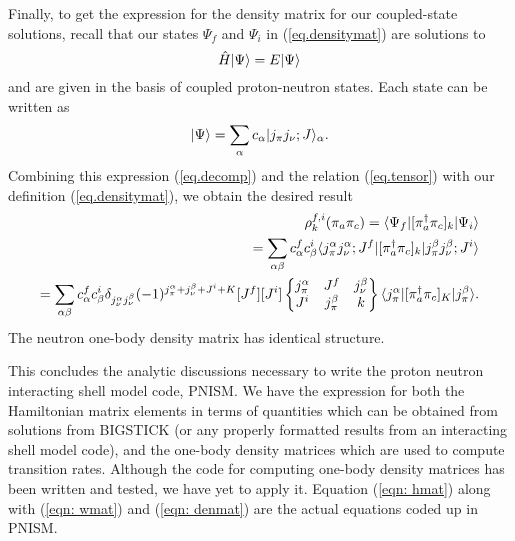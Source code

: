 Finally, to get the expression for the density matrix for our coupled-state solutions, recall
that our states $\Psi_f$ and $\Psi_i$ in (\ref{eq.densitymat}) are solutions to 
\begin{equation}
\hat{H}_{} |\Psi\rangle = E |\Psi\rangle
\end{equation}
and are given in the basis of coupled proton-neutron states. Each state can be written as
\begin{equation}\label{eq.decomp}
|\Psi\rangle=\sum_\alpha c_\alpha |j_{\pi}j_{\nu};J\rangle_\alpha.
\end{equation}
Combining this expression (\ref{eq.decomp}) and the relation (\ref{eq.tensor}) with our definition 
(\ref{eq.densitymat}), we obtain the desired result
\begin{equation}\begin{split}\label{eqn: denmat}
\rho_k^{f,i}(\pi_a\pi_c)=\langle \Psi_f|[\pi_a^{\dagger} \pi_c]_k|\Psi_i\rangle \\
=\sum_{\alpha\beta}c_{\alpha}^fc_{\beta}^i 
\langle j_{\pi}^\alpha j_{\nu}^\alpha;J^f|
[\pi_a^{\dagger} \pi_c]_k
|j_{\pi}^\beta j_{\nu}^\beta;J^i\rangle \\
=\sum_{\alpha\beta}c_{\alpha}^fc_{\beta}^i
\delta_{j_{\nu}^\alpha j_{\nu}^\beta}(-1)^{j_{\pi}^\alpha+j_{\nu}^\beta+J^i+K}[J^f][J^i]
\begin{Bmatrix} 
j_{\pi}^\alpha & J^f & j_{\nu}^\beta \\ 
J^i & j_{\pi}^\beta & k
\end{Bmatrix}
\langle j_{\pi}^\alpha|[\pi_a^{\dagger} \pi_c]_K|j_{\pi}^\beta\rangle.
\end{split}\end{equation}
The neutron one-body density matrix has identical structure.

This concludes the analytic discussions necessary to write the proton
neutron interacting shell model code, PNISM. We have the expression for both the
Hamiltonian matrix elements in terms of quantities which can be obtained from 
solutions from BIGSTICK (or any properly formatted results from an interacting 
shell model code), and the one-body density matrices which are used to compute
transition rates. Although the code for computing one-body density matrices has 
been written and tested, we have yet to apply it. Equation (\ref{eqn: hmat}) along with (\ref{eqn: wmat}) and 
(\ref{eqn: denmat}) are the actual equations coded up in PNISM.







